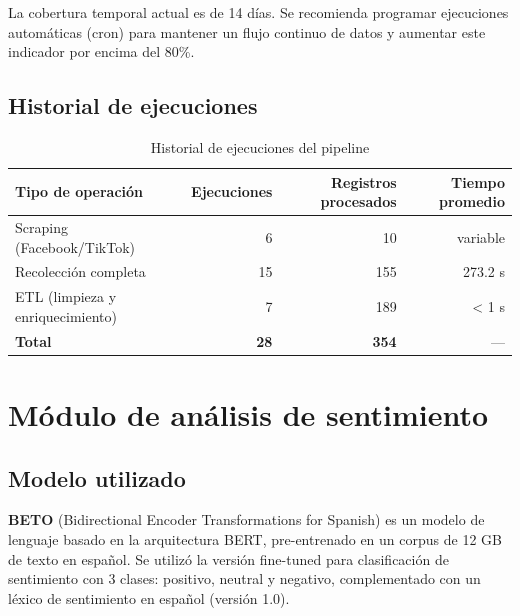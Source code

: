 \documentclass[11pt,a4paper]{article}
\begin{document}
\begin{warningbox}
La cobertura temporal actual es de 14 días. Se recomienda programar ejecuciones automáticas (cron) para mantener un flujo continuo de datos y aumentar este indicador por encima del 80\%.
\end{warningbox}

\subsection{Historial de ejecuciones}

\begin{table}[H]
\centering
\begin{tabularx}{\textwidth}{l r r r}
\toprule
\textbf{Tipo de operación} & \textbf{Ejecuciones} & \textbf{Registros procesados} & \textbf{Tiempo promedio} \\
\midrule
Scraping (Facebook/TikTok) & 6 & 10 & variable \\
\rowcolor{tablerow}
Recolección completa & 15 & 155 & 273.2 s \\
ETL (limpieza y enriquecimiento) & 7 & 189 & < 1 s \\
\midrule
\textbf{Total} & \textbf{28} & \textbf{354} & — \\
\bottomrule
\end{tabularx}
\caption{Historial de ejecuciones del pipeline}
\end{table}

\section{Módulo de análisis de sentimiento}

\subsection{Modelo utilizado}

\begin{infobox}
\textbf{BETO} (Bidirectional Encoder Transformations for Spanish) es un modelo de lenguaje basado en la arquitectura BERT, pre-entrenado en un corpus de 12 GB de texto en español. Se utilizó la versión fine-tuned para clasificación de sentimiento con 3 clases: positivo, neutral y negativo, complementado con un léxico de sentimiento en español (versión 1.0).
\end{infobox}
\end{document}
